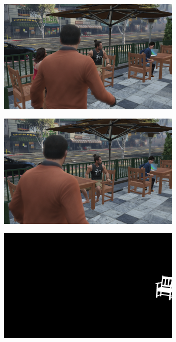 \begin{figure}
\centering
\begin{subfigure}[t]{0.19\textwidth}
\centering
\includegraphics[scale=0.07]{good_examples/visual_99358_img.png}
\end{subfigure}
\begin{subfigure}[t]{0.19\textwidth}
\centering
\includegraphics[scale=0.07]{good_examples/visual_99358_img1.png}
\end{subfigure}
\begin{subfigure}[t]{0.19\textwidth}
\centering
\includegraphics[scale=0.07]{good_examples/visual_99358_gt.png}

\end{subfigure}
\end{figure}
